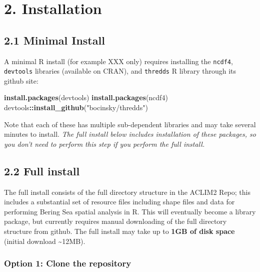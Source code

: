 \documentclass[
]{article}
\newenvironment{Shaded}{\begin{snugshade}}{\end{snugshade}}
\newcommand{\KeywordTok}[1]{\textcolor[rgb]{0.13,0.29,0.53}{\textbf{#1}}}
\newcommand{\NormalTok}[1]{#1}
\newcommand{\OperatorTok}[1]{\textcolor[rgb]{0.81,0.36,0.00}{\textbf{#1}}}
\newcommand{\StringTok}[1]{\textcolor[rgb]{0.31,0.60,0.02}{#1}}
\begin{document}
\hypertarget{installation}{%
\section{2. Installation}\label{installation}}

\hypertarget{minimal-install}{%
\subsection{2.1 Minimal Install}\label{minimal-install}}

A minimal R install (for example XXX only) requires installing the
\texttt{ncdf4}, \texttt{devtools} libraries (available on CRAN), and
\texttt{thredds} R library through its github site:

\begin{Shaded}
\begin{Highlighting}[]
    \KeywordTok{install.packages}\NormalTok{(devtools)}
    \KeywordTok{install.packages}\NormalTok{(ncdf4)}
\NormalTok{    devtools}\OperatorTok{::}\KeywordTok{install_github}\NormalTok{(}\StringTok{"bocinsky/thredds"}\NormalTok{)}
\end{Highlighting}
\end{Shaded}

Note that each of these has multiple sub-dependent libraries and may
take several minutes to install. \emph{The full install below includes
installation of these packages, so you don't need to perform this step
if you perform the full install.}

\hypertarget{full-install}{%
\subsection{2.2 Full install}\label{full-install}}

The full install consists of the full directory structure in the ACLIM2
Repo; this includes a substantial set of resource files including shape
files and data for performing Bering Sea spatial analysis in R. This
will eventually become a library package, but currently requires manual
downloading of the full directory structure from github. The full
install may take up to \textbf{1GB of disk space} (initial download
\textasciitilde12MB).

\hypertarget{option-1-clone-the-repository}{%
\subsubsection{Option 1: Clone the
repository}\label{option-1-clone-the-repository}}
\end{document}
